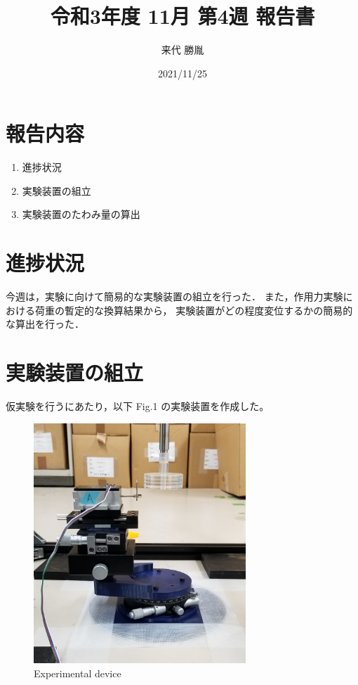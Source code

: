 \documentclass[twocolumn,a4j]{jsarticle}
\author{来代 勝胤}
\title{令和3年度 11月 第4週 報告書}
\date{2021/11/25}
\begin{document}
\columnseprule=0.1mm

\maketitle
\section*{報告内容}
\begin{enumerate}[1.]
    \item 進捗状況
    \item 実験装置の組立
    \item 実験装置のたわみ量の算出
\end{enumerate}

\section{進捗状況}
今週は，実験に向けて簡易的な実験装置の組立を行った．
また，作用力実験における荷重の暫定的な換算結果から，
実験装置がどの程度変位するかの簡易的な算出を行った．

\section{実験装置の組立}
仮実験を行うにあたり，以下 Fig.1 の実験装置を作成した。
\begin{figure}[htbp]
    \footnotesize
    \begin{center}
        \includegraphics[width=80mm]{../images/device_1.jpg}
        \caption{Experimental device}
    \end{center}
\end{figure}
\end{document}
